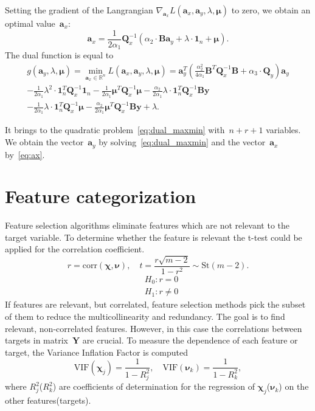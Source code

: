 \documentclass[12pt,twoside]{article}
\newcommand{\by}{\mathbf{y}}
\newcommand{\ba}{\mathbf{a}}
\newcommand{\bY}{\mathbf{Y}}
\newcommand{\bB}{\mathbf{B}}
\newcommand{\bQ}{\mathbf{Q}}
\newcommand{\bbR}{\mathbb{R}}
\newcommand{\bchi}{\boldsymbol{\chi}}
\newcommand{\bnu}{\boldsymbol{\nu}}
\newcommand{\bmu}{\boldsymbol{\mu}}
\newcommand{\bOne}{\boldsymbol{1}}
\begin{document}
Setting the gradient of the Langrangian $\nabla_{\ba_x} L(\ba_x, \ba_y, \lambda, \bmu)$ to zero, we obtain an optimal value~$\ba_x$:
\begin{equation}
	\ba_x = \frac{1}{2\alpha_1} \bQ_x^{-1} \left( \alpha_2 \cdot \bB \ba_y +\lambda \cdot \bOne_n + \bmu \right).
	\label{eq:ax}
\end{equation}
The dual function is equal to
\begin{multline*}
	g(\ba_y, \lambda, \bmu) 
	= \min_{\ba_x \in \bbR^n} L(\ba_x, \ba_y, \lambda, \bmu) = %
	\ba_y^T \left(\frac{\alpha_2^2}{4\alpha_1} \bB^T \bQ_x^{-1} \bB + \alpha_3 \cdot \bQ_y\right) \ba_y \\ - \frac{1}{2 \alpha_1} \lambda^2 \cdot \bOne_n^T \bQ_x^{-1} \bOne_n - \frac{1}{2 \alpha_1} \bmu^T \bQ_x^{-1} \bmu - \frac{\alpha_2}{2 \alpha_1} \lambda \cdot \bOne_n^T \bQ_x^{-1} \bB \by \\ - \frac{1}{2 \alpha_1} \lambda \cdot \bOne_n^T \bQ_x^{-1} \bmu - \frac{\alpha_2}{2 \alpha_1} \bmu^T \bQ_x^{-1} \bB \by + \lambda. 
\end{multline*} 

It brings to the quadratic problem~\eqref{eq:dual_maxmin} with~$n + r + 1$ variables. We obtain the vector~$\ba_y$ by solving~\eqref{eq:dual_maxmin} and the vector~$\ba_x$ by~\eqref{eq:ax}.

\section{Feature categorization}
Feature selection algorithms eliminate features which are not relevant to the target variable. 
To determine whether the feature is relevant the t-test could be applied for the correlation coefficient.
\[
	r = \text{corr} (\bchi, \bnu), \quad t = \frac{r \sqrt{m - 2}}{1 - r^2} \sim \text{St} (m - 2).
\]
\begin{align*}
&H_0: r = 0 \\
&H_1: r \neq 0
\end{align*}
If features are relevant, but correlated, feature selection methods pick the subset of them to reduce the multicollinearity and redundancy.
The goal is to find relevant, non-correlated features. 
However, in this case the correlations between targets in matrix~$\bY$ are crucial.
To measure the dependence of each feature or target, the Variance Inflation Factor is computed
\[
	\text{VIF}(\bchi_j) = \frac{1}{1 - R_j^2}, \quad \text{VIF}(\bnu_k) = \frac{1}{1 - R_k^2},
\]
where $R_j^2$($R_k^2$) are coefficients of determination for the regression of $\bchi_j$($\bnu_k$) on the other features(targets).
\end{document}

